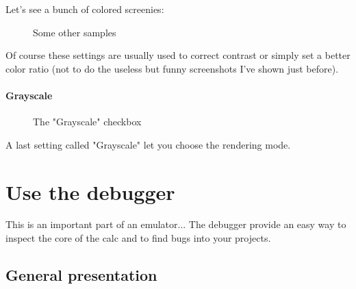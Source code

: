 \documentclass[10pt]{report}
\begin{document}
Let's see a bunch of colored screenies:\newline
\begin{figure}[H]
\centering
{}
\caption{Some other samples}
\end{figure}

Of course these settings are usually used to correct contrast or simply set a better color ratio (not to do the useless but funny screenshots I've shown just before).\newline

\paragraph{Grayscale}


\begin{figure}[H]
\centering
{}
\caption{The "Grayscale" checkbox}
\end{figure}

A last setting called "Grayscale" let you choose the rendering mode.\newline

\section{Use the debugger}
This is an important part of an emulator...\newline
The debugger provide an easy way to inspect the core of the calc and to find bugs into your projects.\newline

\subsection{General presentation}
\end{document}
